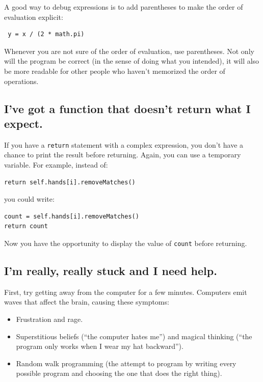 A good way to debug expressions is to add parentheses to make
the order of evaluation explicit:

\begin{lstlisting}
 y = x / (2 * math.pi)
\end{lstlisting}
%
Whenever you are not sure of the order of evaluation, use
parentheses.  Not only will the program be correct (in the sense
of doing what you intended), it will also be more readable for
other people who haven't memorized the order of operations.


\subsection{I've got a function that doesn't return what I
expect.}

If you have a {\tt return} statement with a complex expression,
you don't have a chance to print the result before
returning.  Again, you can use a temporary variable.  For
example, instead of:

\begin{lstlisting}
return self.hands[i].removeMatches()
\end{lstlisting}
%
you could write:

\begin{lstlisting}
count = self.hands[i].removeMatches()
return count
\end{lstlisting}
%
Now you have the opportunity to display the value of
{\tt count} before returning.


\subsection{I'm really, really stuck and I need help.}

First, try getting away from the computer for a few minutes.
Computers emit waves that affect the brain, causing these
symptoms:

\begin{itemize}

\item Frustration and rage.

\item Superstitious beliefs (``the computer hates me'') and
magical thinking (``the program only works when I wear my
hat backward'').

\item Random walk programming (the attempt to program by writing
every possible program and choosing the one that does the right
thing).

\end{itemize}

